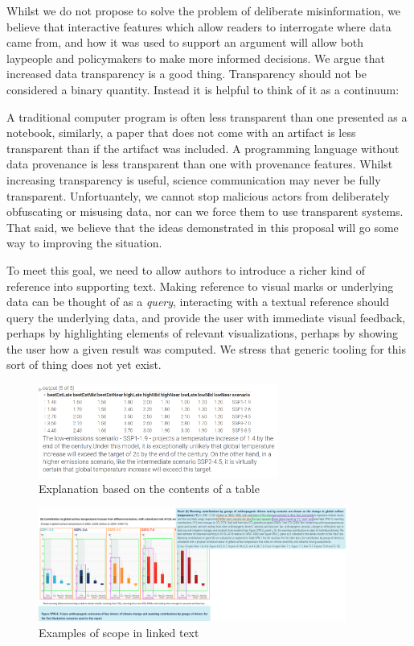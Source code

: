 Whilst we do not propose to solve the problem of deliberate misinformation, we believe
that interactive features which allow readers to interrogate where data came from, and how
it was used to support an argument will allow both laypeople and policymakers to make more
informed decisions. We argue that increased data transparency is a good thing. Transparency
should not be considered a binary quantity. Instead it is helpful to think of it as a continuum:

A traditional computer program is often less transparent than one presented as a notebook,
similarly, a paper that does not come with an artifact is less transparent than if the artifact
was included. A programming language without data provenance is less transparent than one with
provenance features. Whilst increasing transparency is useful, science communication may never
be fully transparent. Unfortuantely, we cannot stop malicious
actors from deliberately obfuscating or misusing data, nor can we force them to use transparent
systems. That said, we believe that the ideas demonstrated in this proposal will go some way
to improving the situation.

To meet this goal, we need to allow authors to introduce a richer kind of reference into supporting
text. Making reference to visual marks or underlying data can be thought of as a \emph{query},
interacting with a textual reference should query the underlying data, and provide the user with immediate
visual feedback, perhaps by highlighting elements of relevant visualizations, perhaps by showing the user
how a given result was computed. We stress that generic tooling for this sort of thing does not yet exist.

\begin{figure}[h]
   \includegraphics[width=0.7\textwidth]{fig/ipcc-table-explanation.png}
   \caption{Explanation based on the contents of a table}
   \label{fig:table-explanation}
\end{figure}

\begin{figure}
   \includegraphics[width=0.9\textwidth]{fig/ipcc-visual-elements.png}
   \caption{Examples of scope in linked text}
   \label{fig:visual-element-scope}
\end{figure}

